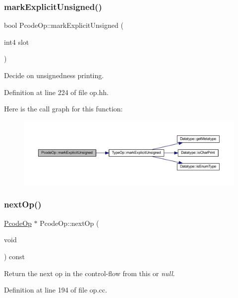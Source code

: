 \subsubsection{\texorpdfstring{markExplicitUnsigned()}{markExplicitUnsigned()}}
{\footnotesize\ttfamily bool Pcode\+Op\+::mark\+Explicit\+Unsigned (\begin{DoxyParamCaption}\item[{int4}]{slot }\end{DoxyParamCaption})\hspace{0.3cm}{\ttfamily [inline]}}



Decide on unsignedness printing. 



Definition at line 224 of file op.\+hh.

Here is the call graph for this function\+:
\nopagebreak
\begin{figure}[H]
\begin{center}
\leavevmode
\includegraphics[width=350pt]{class_pcode_op_a4a9896fa29357fad1c29a0714863a493_cgraph}
\end{center}
\end{figure}
\mbox{\label{class_pcode_op_a6d5fd39f58bea087491f7d86250b0165}} 
\subsubsection{\texorpdfstring{nextOp()}{nextOp()}}
{\footnotesize\ttfamily \mbox{\hyperlink{class_pcode_op}{Pcode\+Op}} $\ast$ Pcode\+Op\+::next\+Op (\begin{DoxyParamCaption}\item[{void}]{ }\end{DoxyParamCaption}) const}



Return the next op in the control-\/flow from this or {\itshape null}. 



Definition at line 194 of file op.\+cc.

